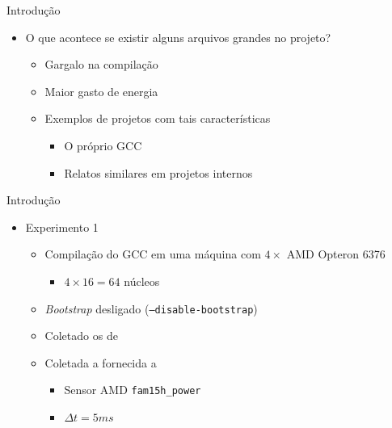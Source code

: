 \begin{frame}{Introdução}
    \begin{itemize}
        \item O que acontece se existir alguns arquivos grandes no projeto?
        \begin{itemize}
            \item Gargalo na compilação
            \item Maior gasto de energia
            \item Exemplos de projetos com tais características
                \begin{itemize}
                    \item O próprio GCC
                    \item Relatos similares em projetos internos \citep{mailgcc}
                \end{itemize}
        \end{itemize}
    \end{itemize}
\end{frame}

\begin{frame}{Introdução}
    \begin{itemize}
        \item Experimento 1
        \begin{itemize}
            \item Compilação do GCC em uma máquina com $4\times$ AMD Opteron 6376
                \begin{itemize}
                    \item $4 \times 16 = 64$ núcleos
                \end{itemize}
            \item \textit{Bootstrap} desligado (\texttt{--disable-bootstrap})
            \item Coletado os {\color{blue}{tempos de compilação}} de {\color{red}{cada arquivo}}
            \item Coletada a {\color{blue}{soma da potência instantânea}} fornecida a
                {\color{red}{cada processador}}
                \begin{itemize}
                    \item Sensor AMD \texttt{fam15h\_power}
                    \item $\Delta t = 5ms$
                \end{itemize}
        \end{itemize}
    \end{itemize}
\end{frame}

